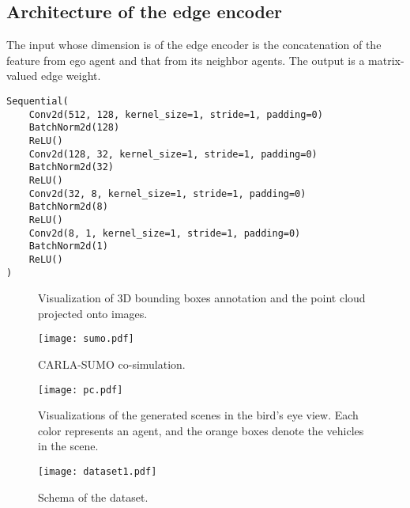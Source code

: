\documentclass{article}
\begin{document}
\subsection{Architecture of the edge encoder}
The input whose dimension is  of the edge encoder is the concatenation of the feature from ego agent and that from its neighbor agents. The output is a matrix-valued edge weight.

\begin{verbatim}
Sequential(
    Conv2d(512, 128, kernel_size=1, stride=1, padding=0)
    BatchNorm2d(128)
    ReLU()     
    Conv2d(128, 32, kernel_size=1, stride=1, padding=0)
    BatchNorm2d(32)
    ReLU()     
    Conv2d(32, 8, kernel_size=1, stride=1, padding=0)
    BatchNorm2d(8)
    ReLU()     
    Conv2d(8, 1, kernel_size=1, stride=1, padding=0)
    BatchNorm2d(1)
    ReLU()     
)
\end{verbatim}

\begin{figure}[t]
\centering
  \vspace{-2mm}
\centering
	\vspace{-2mm}
\caption{Visualization of 3D bounding boxes annotation and the point cloud projected onto images.}
\label{fig:boxes}
	\vspace{-2mm}
\end{figure}
 
\begin{figure}[t]
	\centering
	\texttt{[image: sumo.pdf]}
	\caption{CARLA-SUMO co-simulation.}
	\label{fig:sumo}
\end{figure}

\begin{figure}[t]
	\centering
	\texttt{[image: pc.pdf]}
	\caption{Visualizations of the generated scenes in the bird's eye view. Each color represents an agent, and the orange boxes denote the vehicles in the scene.}
	\label{fig:pc}
\end{figure}
\begin{figure}[t]
	\centering
	\texttt{[image: dataset1.pdf]}
	\caption{Schema of the dataset.}
	\label{fig:schema}
\end{figure}
\end{document}
